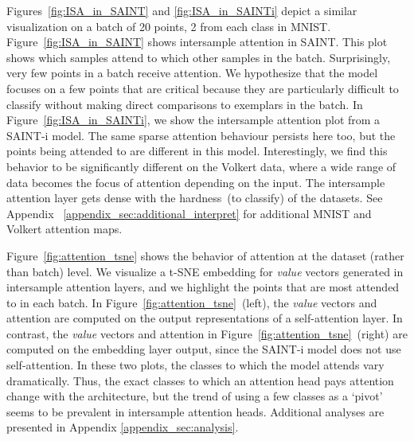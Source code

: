 \documentclass{article}
\newcommand{\gowthami}[1]{\textcolor{red}{#1}}
\newcommand{\tom}[1]{\textcolor{green}{#1}}
\begin{document}
Figures~\ref{fig:ISA_in_SAINT} and \ref{fig:ISA_in_SAINTi} depict a similar visualization on a batch of 20 points, 2 from each class in MNIST. Figure~\ref{fig:ISA_in_SAINT} shows intersample attention in SAINT. This plot shows which samples attend to which other samples in the batch. Surprisingly, very few points in a batch receive attention. We hypothesize that the model focuses on a few points that are critical because they are particularly difficult to classify without making direct comparisons to exemplars in the batch.
In Figure~\ref{fig:ISA_in_SAINTi}, we show the intersample attention plot from a SAINT-i model. The same sparse attention behaviour persists here too, but the points being attended to are different in this model. Interestingly, we find this behavior to be significantly different on the Volkert data, where a wide range of data becomes the focus of attention depending on the input. The intersample attention layer gets dense with the hardness~(to classify) of the datasets. See Appendix ~\ref{appendix_sec:additional_interpret} for additional MNIST and Volkert attention maps.

Figure~\ref{fig:attention_tsne} shows the behavior of attention at the dataset (rather than batch) level. We visualize a t-SNE \citep{van2008visualizing} embedding for \textit{value} vectors generated in intersample attention layers, and we highlight the points that are most attended to in each batch. In Figure~\ref{fig:attention_tsne}~(left), the \textit{value} vectors and attention are computed on the output representations of a self-attention layer. 
In contrast, the \textit{value} vectors and attention in Figure~\ref{fig:attention_tsne}~(right) are computed on the embedding layer output, since the SAINT-i model does not use self-attention.  In these two plots, the classes to which the model attends vary dramatically. Thus, the exact classes to which an attention head pays attention change with the architecture, but the trend of using a few classes as a `pivot' seems to be prevalent in intersample attention heads. %
Additional analyses are presented in Appendix \ref{appendix_sec:analysis}.
\end{document}
